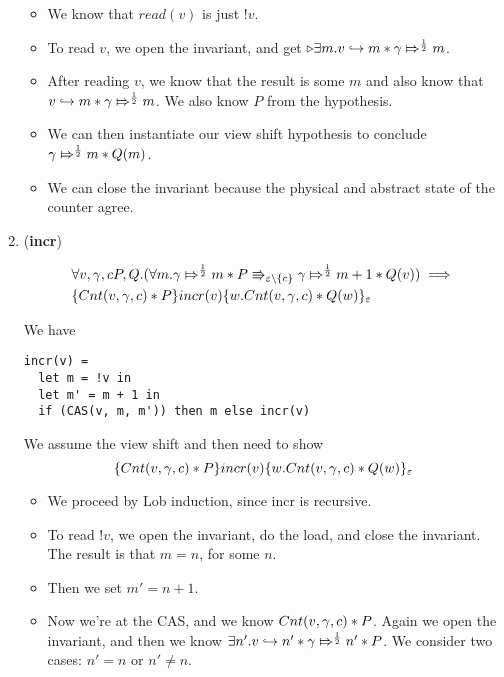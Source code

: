 \begin{enumerate}
\begin{itemize}
\item We know that $read(v)$ is just $!v$.
\item To read $v$, we open the invariant, and get $\latermod{\exists m. \pointsto{v}{m} * \apointsto{\gamma}{m}{\frac{1}{2}}}$.
\item After reading $v$, we know that the result is some $m$ and also know that $\pointsto{v}{m} * \apointsto{\gamma}{m}{\frac{1}{2}}$. We also know $P$ from the hypothesis.
\item We can then instantiate our view shift hypothesis to conclude $\apointsto{\gamma}{m}{\frac{1}{2}} * Q(m)$.
\item We can close the invariant because the physical and abstract state of the counter agree.
\end{itemize}

\item (\textbf{incr})

\begin{align*}
& \forall v, \gamma, c P, Q. (\forall m. \apointsto{\gamma}{m}{\frac{1}{2}} * P \Rrightarrow_{\varepsilon \backslash \{c\}} \apointsto{\gamma}{m + 1}{\frac{1}{2}} * Q(v)) \implies \\
& \hot{\Cnt{v}{\gamma}{c} * P}{incr(v)}{w. \Cnt{v}{\gamma}{c} * Q(w)}_{\varepsilon} 
\end{align*}

We have 
\begin{verbatim}
incr(v) =
  let m = !v in
  let m' = m + 1 in
  if (CAS(v, m, m')) then m else incr(v)
\end{verbatim}

We assume the view shift and then need to show
\[ \hot{\Cnt{v}{\gamma}{c} * P}{incr(v)}{w. \Cnt{v}{\gamma}{c} * Q(w)}_{\varepsilon}  \]

\begin{itemize}
\item We proceed by Lob induction, since incr is recursive.

\item To read $!v$, we open the invariant, do the load, and close the invariant. The result is that $m = n$, for some $n$.

\item Then we set $m' = n + 1$.

\item Now we're at the CAS, and we know $\Cnt{v}{\gamma}{c} * P$. Again we open the invariant, and then we know $\exists n'. \pointsto{v}{n'} * \apointsto{\gamma}{n'}{\frac{1}{2}} * P$. We consider two cases: $n' = n$ or $n' \ne n$.


\end{itemize}
\end{enumerate}
